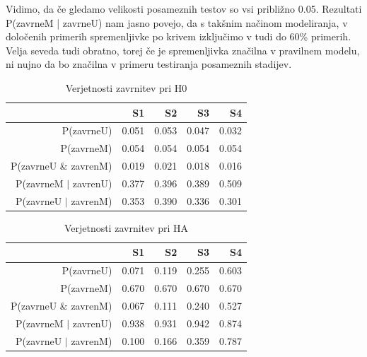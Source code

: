 \documentclass[letterpaper,11pt]{article}
\begin{document}
Vidimo, da če gledamo velikosti posameznih testov so vsi približno 0.05. Rezultati P(zavrneM | zavrneU) nam jasno povejo, da s takšnim načinom modeliranja, v določenih primerih spremenljivke po krivem izključimo v tudi do 60\% primerih. Velja seveda tudi obratno, torej če je spremenljivka značilna v pravilnem modelu, ni nujno da bo značilna v primeru testiranja posameznih stadijev.

\begin{table}[ht]
\centering
\begin{tabular}{rrrrr}
  \hline
 & S1 & S2 & S3 & S4 \\ 
  \hline
P(zavrneU) & 0.051 & 0.053 & 0.047 & 0.032 \\ 
  P(zavrneM) & 0.054 & 0.054 & 0.054 & 0.054 \\ 
  P(zavrneU \& zavrenM) & 0.019 & 0.021 & 0.018 & 0.016 \\ 
  P(zavrneM $|$ zavrenU) & 0.377 & 0.396 & 0.389 & 0.509 \\ 
  P(zavrneU $|$ zavrenM) & 0.353 & 0.390 & 0.336 & 0.301 \\ 
   \hline
\end{tabular}
\caption{Verjetnosti zavrnitev pri H0} 
\label{table:4}
\end{table}

\begin{table}[ht]
\centering
\begin{tabular}{rrrrr}
  \hline
 & S1 & S2 & S3 & S4 \\ 
  \hline
P(zavrneU) & 0.071 & 0.119 & 0.255 & 0.603 \\ 
  P(zavrneM) & 0.670 & 0.670 & 0.670 & 0.670 \\ 
  P(zavrneU \& zavrenM) & 0.067 & 0.111 & 0.240 & 0.527 \\ 
  P(zavrneM $|$ zavrenU) & 0.938 & 0.931 & 0.942 & 0.874 \\ 
  P(zavrneU $|$ zavrenM) & 0.100 & 0.166 & 0.359 & 0.787 \\ 
   \hline
\end{tabular}
\caption{Verjetnosti zavrnitev pri HA} 
\label{table:5}
\end{table}
\end{document}
